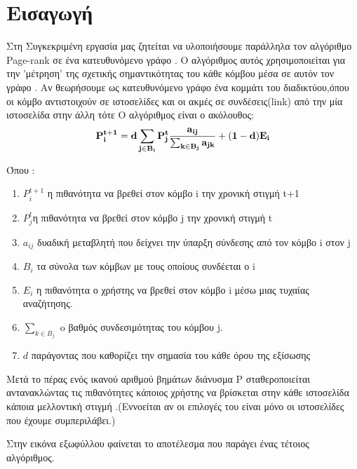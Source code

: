 \chapter{Εισαγωγή}
Στη Συγκεκριμένη εργασία μας ζητείται να υλοποιήσουμε παράλληλα τον αλγόριθμο Page-rank σε ένα κατευθυνόμενο γράφο .
Ο αλγόριθμος αυτός χρησιμοποιείται για την 'μέτρηση' 
της σχετικής σημαντικότητας του κάθε κόμβου μέσα σε αυτόν τον γράφο  .
Αν θεωρήσουμε ως κατευθυνόμενο γράφο ένα κομμάτι του διαδικτύου,όπου οι κόμβο αντιστοιχούν σε ιστοσελίδες
και οι ακμές σε συνδέσεις(link) από την μία ιστοσελίδα στην άλλη τότε 
Ο αλγόριθμος είναι ο ακόλουθος:\\
  \begin{equation*}
  \bold {P^{t+1}_i = d \sum_{j \in B_i} P^t_j  \frac{a_{ij}}{ \sum_{k \in B_j} {a_{jk}} } + (1-d)E_i}
  \end{equation*}
  
  Όπου :
\begin{enumerate}
	\item $P^{t+1}_i$ η πιθανότητα να βρεθεί στον κόμβο i την χρονική στιγμή t+1
	\item $P^t_j$η πιθανότητα να βρεθεί στον κόμβο j την χρονική στιγμή t
	\item $a_{ij}$  δυαδική μεταβλητή που δείχνει την ύπαρξη σύνδεσης από τον κόμβο i στον j
	\item $B_i$ τα σύνολα των κόμβων με τους οποίους συνδέεται ο i
	\item $E_i$ η πιθανότητα ο χρήστης να βρεθεί στον κόμβο i μέσω μιας τυχαίας αναζήτησης.
	\item $\sum_{k \in B_j}$ o βαθμός συνδεσιμότητας του κόμβου j.
	\item $d$ παράγοντας που καθορίζει την σημασία του κάθε όρου της εξίσωσης  
\end{enumerate}

Μετά το πέρας ενός ικανού αριθμού βημάτων 
διάνυσμα P σταθεροποιείται αντανακλώντας τις πιθανότητες κάποιος χρήστης να βρίσκεται στην κάθε  ιστοσελίδα
κάποια μελλοντική στιγμή .(Εννοείται αν οι επιλογές του είναι μόνο οι ιστοσελίδες που έχουμε συμπεριλάβει.)
 
  Στην  εικόνα εξωφύλλου φαίνεται το  αποτέλεσμα που παράγει ένας τέτοιος αλγόριθμος. 
  